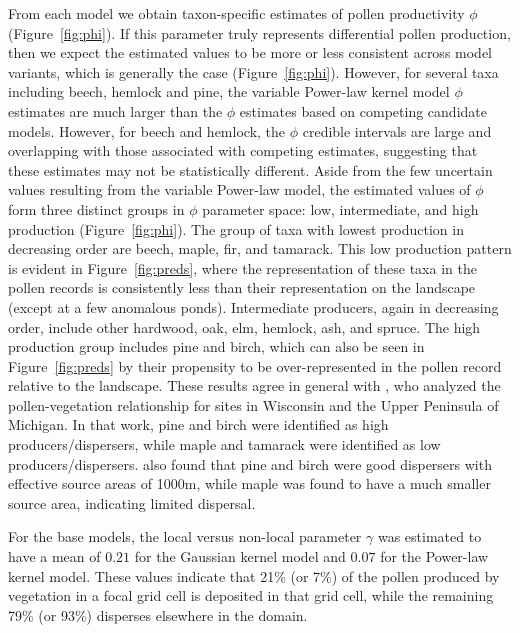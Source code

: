 \documentclass[12pt]{article}
\begin{document}
From each model we obtain taxon-specific estimates of pollen
productivity $\phi$ (Figure~\ref{fig:phi}). If this parameter truly
represents differential pollen production, then we expect the
estimated values to be more or less consistent across model variants,
which is generally the case (Figure~\ref{fig:phi}). However, for
several taxa including beech, hemlock and pine, the variable Power-law
kernel model $\phi$ estimates are much larger than the $\phi$
estimates based on competing candidate models. However, for beech and
hemlock, the $\phi$ credible intervals are large and overlapping with
those associated with competing estimates, suggesting that these
estimates may not be statistically different. Aside from the few
uncertain values resulting from the variable Power-law model, the
estimated values of $\phi$ form three distinct groups in $\phi$
parameter space: low, intermediate, and high production
(Figure~\ref{fig:phi}). The group of taxa with lowest production in
decreasing order are beech, maple, fir, and tamarack. This low
production pattern is evident in Figure~\ref{fig:preds}, where the
representation of these taxa in the pollen records is consistently
less than their representation on the landscape (except at a few
anomalous ponds). Intermediate producers, again in decreasing order,
include other hardwood, oak, elm, hemlock, ash, and spruce. The high
production group includes pine and birch, which can also be seen in
Figure~\ref{fig:preds} by their propensity to be over-represented in
the pollen record relative to the landscape. These results agree in
general with \citep{prentice1986}, who analyzed the pollen-vegetation
relationship for sites in Wisconsin and the Upper Peninsula of
Michigan. In that work, pine and birch were identified as high
producers/dispersers, while maple and tamarack were identified as low
producers/dispersers. \citep{jackson1990} also found that pine and
birch were good dispersers with effective source areas of 1000m, while
maple was found to have a much smaller source area, indicating limited
dispersal.

For the base models, the local versus non-local parameter $\gamma$ was
estimated to have a mean of $0.21$ for the Gaussian kernel model and
$0.07$ for the Power-law kernel model. These values indicate that 21\%
(or 7\%) of the pollen produced by vegetation in a focal grid cell is
deposited in that grid cell, while the remaining 79\% (or 93\%)
disperses elsewhere in the domain.
\end{document}
